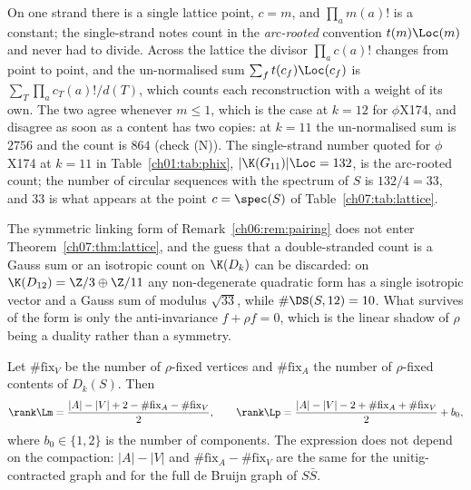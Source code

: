 \begin{remark}\label{ch07:rem:norm}
On one strand there is a single lattice point, $c=m$, and $\prod_a m(a)!$ is a constant; the
single-strand notes count in the \emph{arc-rooted} convention $t(m)\Loc(m)$ and never had to
divide. Across the lattice the divisor $\prod_a c(a)!$ changes from point to point, and the
un-normalised sum $\sum_f t(c_f)\Loc(c_f)$ is $\sum_T \prod_a c_T(a)!/d(T)$, which counts each
reconstruction with a weight of its own. The two agree whenever $m\le1$, which is the case at
$k=12$ for $\phi$X174, and disagree as soon as a content has two copies: at $k=11$ the
un-normalised sum is $2756$ and the count is $864$ (check (N)). The single-strand number
quoted for $\phi$X174 at $k=11$ in Table~\ref{ch01:tab:phix}, $|\K(G_{11})|\Loc=132$, is the arc-rooted
count; the number of circular sequences with the spectrum of $S$ is $132/4=33$, and $33$ is
what appears at the point $c=\spec(S)$ of Table~\ref{ch07:tab:lattice}.
\end{remark}

\begin{remark}\label{ch07:rem:form}
The symmetric linking form of Remark~\ref{ch06:rem:pairing} does not enter Theorem~\ref{ch07:thm:lattice},
and the guess that a double-stranded count is a Gauss sum or an isotropic count on $\K(D_k)$
can be discarded: on $\K(D_{12})=\Z/3\oplus\Z/11$ any non-degenerate quadratic form has a
single isotropic vector and a Gauss sum of modulus $\sqrt{33}$, while $\#\DS(S,12)=10$. What
survives of the form is only the anti-invariance $f+\rho f=0$, which is the linear shadow of
$\rho$ being a duality rather than a symmetry.
\end{remark}

\begin{theorem}\label{ch07:thm:rank}
Let $\#\mathrm{fix}_V$ be the number of $\rho$-fixed vertices and $\#\mathrm{fix}_A$ the
number of $\rho$-fixed contents of $D_k(S)$. Then
\[
  \rank\Lm=\frac{|A|-|V|+2-\#\mathrm{fix}_A-\#\mathrm{fix}_V}{2},\qquad
  \rank\Lp=\frac{|A|-|V|-2+\#\mathrm{fix}_A+\#\mathrm{fix}_V}{2}+b_0 ,
\]
where $b_0\in\{1,2\}$ is the number of components. The expression does not depend on the
compaction: $|A|-|V|$ and $\#\mathrm{fix}_A-\#\mathrm{fix}_V$ are the same for the
unitig-contracted graph and for the full de Bruijn graph of $S\bar S$.
\end{theorem}

